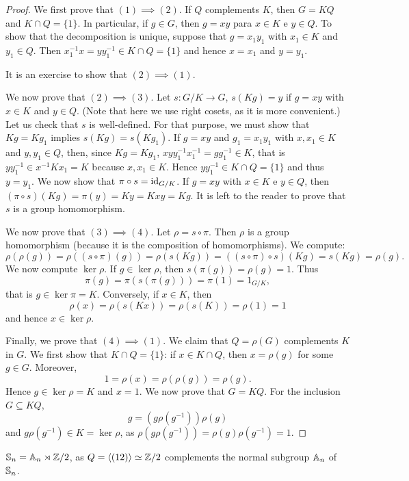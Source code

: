 \begin{proof}
We first prove that $(1)\implies(2)$. If $Q$ complements $K$, then $G=KQ$ and
$K\cap Q=\{1\}$. In particular, if $g\in G$, then $g=xy$ para $x\in K$ e $y\in Q$. To show that
the decomposition is unique, suppose that 
$g=x_1y_1$ with $x_1\in K$ and $y_1\in Q$. Then $x_1^{-1}x=yy_1^{-1}\in K\cap Q=\{1\}$ 
and hence $x=x_1$ and $y=y_1$.

It is an exercise to show that $(2)\implies(1)$.

We now prove that $(2)\implies(3)$. Let $s\colon G/K\to G$, $s(Kg)=y$ if 
$g=xy$ with $x\in K$ and $y\in Q$. (Note that here we use right cosets, as it is more convenient.)
Let us check that $s$ is well-defined. 
For that purpose, we must show that $Kg=Kg_1$ implies $s(Kg)=s(Kg_1)$. If $g=xy$ 
and $g_1=x_1y_1$ with $x,x_1\in K$ and $y,y_1\in Q$, then, since $Kg=Kg_1$, 
$xyy_1^{-1}x_1^{-1}=gg_1^{-1}\in K$, that is $yy_1^{-1}\in x^{-1}Kx_1=K$
 because $x,x_1\in K$. Hence $yy_1^{-1}\in K\cap Q=\{1\}$ and thus $y=y_1$. 
 We now show that $\pi\circ
 s=\operatorname{id}_{G/K}$. If $g=xy$ with $x\in K$ e $y\in Q$, then
$(\pi\circ s)(Kg)=\pi(y)=Ky=Kxy=Kg$. It is left to the reader to prove that 
$s$ is a group homomorphism. 

We now prove that $(3)\implies(4)$. Let $\rho=s\circ\pi$. Then $\rho$ is a group homomorphism (because it is the composition of homomorphisms). We compute: 
\[
\rho(\rho(g))=\rho( (s\circ\pi)(g))=\rho(s(Kg))=((s\circ\pi)\circ s)(Kg)=s(Kg)=\rho(g).
\]
We now compute $\ker\rho$. If $g\in\ker\rho$, then $s(\pi(g))=\rho(g)=1$. Thus 
\[
\pi(g)=\pi(s(\pi(g)))=\pi(1)=1_{G/K},
\]
that is $g\in\ker\pi=K$. Conversely, if $x\in K$, then
\[
\rho(x)=\rho(s(Kx))=\rho(s(K))=\rho(1)=1
\]
and hence $x\in\ker\rho$.

Finally, we prove that $(4)\implies(1)$. We claim that $Q=\rho(G)$ complements $K$ in
 $G$. We first show that $K\cap Q=\{1\}$: if $x\in K\cap Q$, then $x=\rho(g)$ for some $g\in G$. Moreover, 
\[
1=\rho(x)=\rho(\rho(g))=\rho(g).
\]
Hence $g\in\ker\rho=K$ and $x=1$. We now prove that $G=KQ$. For the inclusion $G\subseteq KQ$, 
\[
g=(g\rho(g^{-1}))\rho(g)
\]
and $g\rho(g^{-1})\in K=\ker\rho$, as $\rho(g\rho(g^{-1}))=  \rho(g)\rho(g^{-1})=1$.
\end{proof}

\begin{example}
$\mathbb{S}_n=\mathbb{A}_n\rtimes\mathbb{Z}/2$, as $Q=\langle (12)\rangle\simeq\mathbb{Z}/2$ complements the normal subgroup 
$\mathbb{A}_n$ of $\mathbb{S}_n$.
\end{example}

